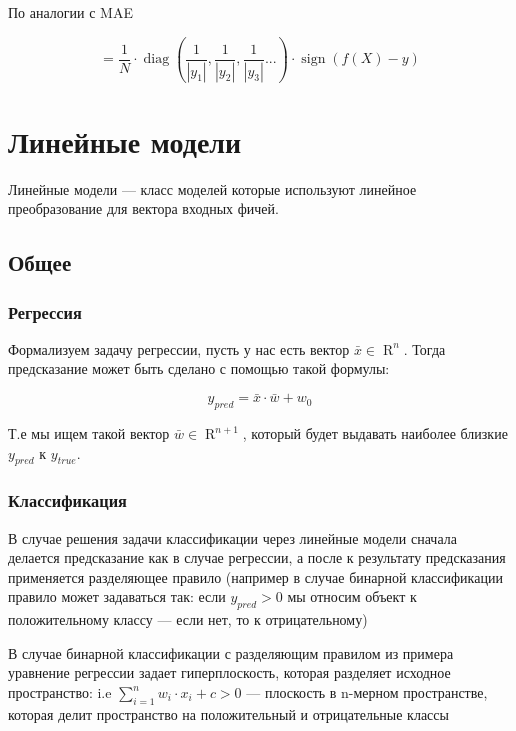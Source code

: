 \documentclass{article}
\begin{document}
    \quad  

    По аналогии с MAE 

    \begin{equation}
        [D_{f(X)}(MAPE)] =  \frac{1}{N} \cdot \operatorname{diag}(\frac{1}{| y_{1} |}, \frac{1}{| y_{2} |}, \frac{1}{| y_{3} |} ...) \cdot  \operatorname{sign}(f(X) - y)
    \end{equation}


    \section{Линейные модели}

    Линейные модели --- класс моделей которые используют линейное преобразование для вектора входных фичей.

    \subsection{Общее}

    \subsubsection{Регрессия}

    Формализуем задачу регрессии, пусть у нас есть вектор $\bar{x} \in \operatorname{R}^{n}$.
    Тогда предсказание может быть сделано с помощью такой формулы:

    \begin{equation}
        y_{pred} = \bar{x} \cdot \bar{w} + w_{0}
    \end{equation}

    Т.е мы ищем такой вектор $\bar{w} \in \operatorname{R}^{n + 1}$, который будет выдавать наиболее близкие $y_{pred}$ к $y_{true}$.

    \subsubsection{Классификация}

    В случае решения задачи классификации через линейные модели сначала делается предсказание как в случае регрессии, а после
    к результату предсказания применяется разделяющее правило (например в случае бинарной классификации правило может задаваться так:
    если $y_{pred} > 0$ мы относим объект к положительному классу --- если нет, то к отрицательному)

    В случае бинарной классификации с разделяющим правилом из примера уравнение регрессии задает гиперплоскость,
    которая разделяет исходное пространство: i.e $\sum_{i = 1}^{n}{w_{i} \cdot x_{i}} + c > 0$ --- плоскость в n-мерном пространстве,
    которая делит пространство на положительный и отрицательные классы
\end{document}
